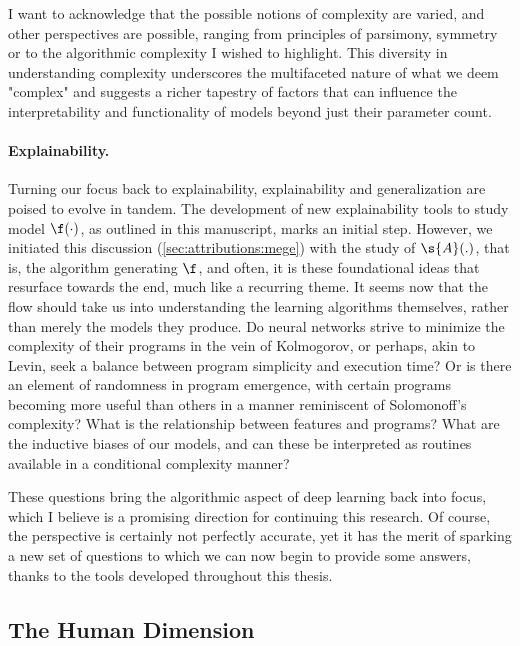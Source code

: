 I want to acknowledge that the possible notions of complexity are varied, and other perspectives are possible, ranging from principles of parsimony, symmetry or to the algorithmic complexity I wished to highlight. This diversity in understanding complexity underscores the multifaceted nature of what we deem "complex" and suggests a richer tapestry of factors that can influence the interpretability and functionality of models beyond just their parameter count.

\paragraph{Explainability.} Turning our focus back to explainability, explainability and generalization are poised to evolve in tandem. The development of new explainability tools to study model $\f(\cdot)$, as outlined in this manuscript, marks an initial step. However, we initiated this discussion (\autoref{sec:attributions:mege}) with the study of $\s{A}(.)$, that is, the algorithm generating $\f$, and often, it is these foundational ideas that resurface towards the end, much like a recurring theme. It seems now that the flow should take us into understanding the learning algorithms themselves, rather than merely the models they produce. Do neural networks strive to minimize the complexity of their programs in the vein of Kolmogorov, or perhaps, akin to Levin, seek a balance between program simplicity and execution time? Or is there an element of randomness in program emergence, with certain programs becoming more useful than others in a manner reminiscent of Solomonoff's complexity? What is the relationship between features and programs? What are the inductive biases of our models, and can these be interpreted as routines available in a conditional complexity manner? 

These questions bring the algorithmic aspect of deep learning back into focus, which I believe is a promising direction for continuing this research. Of course, the perspective is certainly not perfectly accurate, yet it has the merit of sparking a new set of questions to which we can now begin to provide some answers, thanks to the tools developed throughout this thesis. 

\vspace{-2mm}
\subsection{The Human Dimension}
\vspace{-2mm}

